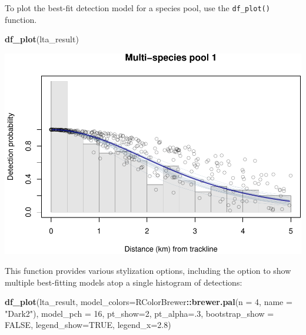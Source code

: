 \documentclass[
]{book}
\newenvironment{Shaded}{\begin{snugshade}}{\end{snugshade}}
\newcommand{\DataTypeTok}[1]{\textcolor[rgb]{0.13,0.29,0.53}{#1}}
\newcommand{\DecValTok}[1]{\textcolor[rgb]{0.00,0.00,0.81}{#1}}
\newcommand{\FloatTok}[1]{\textcolor[rgb]{0.00,0.00,0.81}{#1}}
\newcommand{\KeywordTok}[1]{\textcolor[rgb]{0.13,0.29,0.53}{\textbf{#1}}}
\newcommand{\NormalTok}[1]{#1}
\newcommand{\OperatorTok}[1]{\textcolor[rgb]{0.81,0.36,0.00}{\textbf{#1}}}
\newcommand{\OtherTok}[1]{\textcolor[rgb]{0.56,0.35,0.01}{#1}}
\newcommand{\StringTok}[1]{\textcolor[rgb]{0.31,0.60,0.02}{#1}}
\begin{document}
To plot the best-fit detection model for a species pool, use the \texttt{df\_plot()} function.

\begin{Shaded}
\begin{Highlighting}[]
\KeywordTok{df_plot}\NormalTok{(lta_result)}
\end{Highlighting}
\end{Shaded}

\includegraphics{figures/unnamed-chunk-259-1.pdf}

This function provides various stylization options, including the option to show multiple best-fitting models atop a single histogram of detections:

\begin{Shaded}
\begin{Highlighting}[]
\KeywordTok{df_plot}\NormalTok{(lta_result,}
        \DataTypeTok{model_colors=}\NormalTok{RColorBrewer}\OperatorTok{::}\KeywordTok{brewer.pal}\NormalTok{(}\DataTypeTok{n =} \DecValTok{4}\NormalTok{, }\DataTypeTok{name =} \StringTok{"Dark2"}\NormalTok{),}
        \DataTypeTok{model_pch =} \DecValTok{16}\NormalTok{,}
        \DataTypeTok{pt_show=}\DecValTok{2}\NormalTok{,}
        \DataTypeTok{pt_alpha=}\NormalTok{.}\DecValTok{3}\NormalTok{,}
        \DataTypeTok{bootstrap_show =} \OtherTok{FALSE}\NormalTok{,}
        \DataTypeTok{legend_show=}\OtherTok{TRUE}\NormalTok{,}
        \DataTypeTok{legend_x=}\FloatTok{2.8}\NormalTok{)}
\end{Highlighting}
\end{Shaded}
\end{document}
